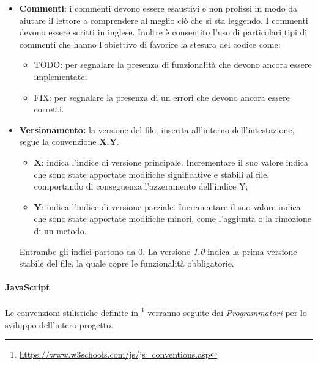 \begin{itemize}
	\item \textbf{Commenti}: i commenti devono essere esaustivi e non prolissi in modo da aiutare il lettore a comprendere al meglio ciò che si sta leggendo. I commenti devono essere scritti in inglese. Inoltre è consentito l'uso di particolari tipi di commenti che hanno l'obiettivo di favorire la stesura del codice come:
	\begin{itemize}
		\item TODO: per segnalare la presenza di funzionalità che devono ancora essere implementate;
		\item FIX: per segnalare la presenza di un errori che devono ancora essere corretti.
	\end{itemize}

	\item \textbf{Versionamento:} la versione del file, inserita all'interno dell'intestazione, segue la convenzione \textbf{X.Y}.
	\begin{itemize}
		\item{\textbf{X}: indica l'indice di versione principale. Incrementare il suo valore indica che sono state apportate modifiche significative e stabili al file, comportando di conseguenza l'azzeramento dell'indice Y;}
		\item{\textbf{Y}: indica l'indice di versione parziale. Incrementare il suo valore indica che sono state apportate modifiche minori, come l'aggiunta o la rimozione di un metodo.}
	\end{itemize}
	Entrambe gli indici partono da 0. La versione \emph{1.0} indica la prima versione stabile del file, la quale copre le funzionalità obbligatorie.
\end{itemize}

\paragraph{JavaScript}\Spazio
Le convenzioni stilistiche definite in \footnote{\url{https://www.w3schools.com/js/js_conventions.asp}} verranno seguite dai \emph{Programmatori} per lo sviluppo dell'intero progetto.

